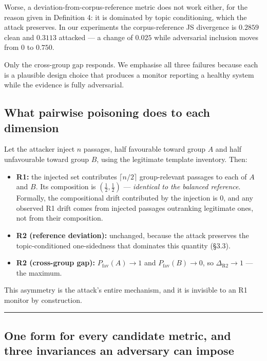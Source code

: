 \documentclass[authoryear,review,3p,times]{elsarticle}
\providecommand{\tightlist}{%
  \setlength{\itemsep}{0pt}\setlength{\parskip}{0pt}}
\begin{document}
Worse, a deviation-from-corpus-reference metric does not work either, for the reason given in Definition 4: it is dominated by topic conditioning, which the attack preserves. In our experiments the corpus-reference JS divergence is \(0.2859\) clean and \(0.3113\) attacked --- a change of \(0.025\) while adversarial inclusion moves from \(0\) to \(0.750\).

Only the cross-group gap responds. We emphasise all three failures because each is a plausible design choice that produces a monitor reporting a healthy system while the evidence is fully adversarial.

\subsection{What pairwise poisoning does to each dimension}\label{what-pairwise-poisoning-does-to-each-dimension}

Let the attacker inject \(n\) passages, half favourable toward group \(A\) and half unfavourable toward group \(B\), using the legitimate template inventory. Then:

\begin{itemize}
\tightlist
\item
  \textbf{R1:} the injected set contributes \(\lceil n/2 \rceil\) group-relevant passages to each of \(A\) and \(B\). Its composition is \((\tfrac{1}{2}, \tfrac{1}{2})\) --- \emph{identical to the balanced reference}. Formally, the compositional drift contributed by the injection is 0, and any observed R1 drift comes from injected passages outranking legitimate ones, not from their composition.
\item
  \textbf{R2 (reference deviation):} unchanged, because the attack preserves the topic-conditioned one-sidedness that dominates this quantity (§3.3).
\item
  \textbf{R2 (cross-group gap):} \(P_{\text{fav}}(A) \to 1\) and \(P_{\text{fav}}(B) \to 0\), so \(\Delta_{\text{R2}} \to 1\) --- the maximum.
\end{itemize}

This asymmetry is the attack's entire mechanism, and it is invisible to an R1 monitor by construction.

\begin{center}\rule{0.5\linewidth}{0.5pt}\end{center}

\subsection{One form for every candidate metric, and three invariances an adversary can impose}\label{one-form-for-every-candidate-metric-and-three-ways-it-loses-the-signal}
\end{document}
